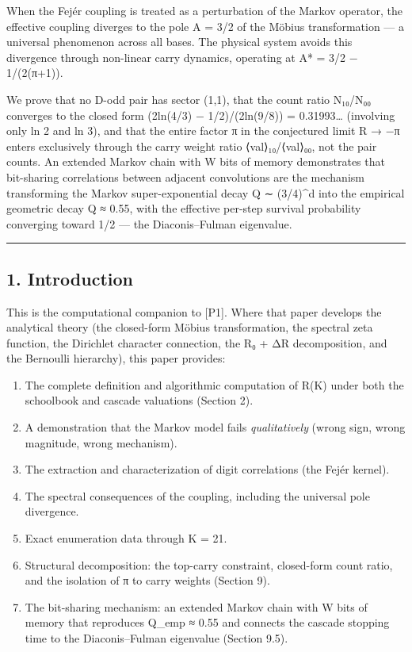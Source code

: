 \documentclass[
  11pt,
]{article}
\providecommand{\tightlist}{%
  \setlength{\itemsep}{0pt}\setlength{\parskip}{0pt}}
\begin{document}
When the Fejér coupling is treated as a perturbation of the Markov operator, the
effective coupling diverges to the pole A = 3/2 of the Möbius transformation ---
a universal phenomenon across all bases. The physical system avoids this
divergence through non-linear carry dynamics, operating at A* = 3/2 −
1/(2(π+1)).

We prove that no D-odd pair has sector (1,1), that the count ratio N₁₀/N₀₀
converges to the closed form (2ln(4/3) − 1/2)/(2ln(9/8)) = 0.31993\ldots{}
(involving only ln 2 and ln 3), and that the entire factor π in the conjectured
limit R → −π enters exclusively through the carry weight ratio ⟨val⟩₁₀/⟨val⟩₀₀,
not the pair counts. An extended Markov chain with W bits of memory demonstrates
that bit-sharing correlations between adjacent convolutions are the mechanism
transforming the Markov super-exponential decay Q ∼ (3/4)\^{}d into the
empirical geometric decay Q ≈ 0.55, with the effective per-step survival
probability converging toward 1/2 --- the Diaconis--Fulman eigenvalue.

\begin{center}\rule{0.5\linewidth}{0.5pt}\end{center}

\newpage

\subsection{1. Introduction}\label{introduction}

This is the computational companion to {[}P1{]}. Where that paper develops the
analytical theory (the closed-form Möbius transformation, the spectral zeta
function, the Dirichlet character connection, the R₀ + ΔR decomposition, and the
Bernoulli hierarchy), this paper provides:

\begin{enumerate}
\def\labelenumi{\arabic{enumi}.}
\tightlist
\item
  The complete definition and algorithmic computation of R(K) under both the
  schoolbook and cascade valuations (Section 2).
\item
  A demonstration that the Markov model fails \emph{qualitatively} (wrong sign,
  wrong magnitude, wrong mechanism).
\item
  The extraction and characterization of digit correlations (the Fejér kernel).
\item
  The spectral consequences of the coupling, including the universal pole
  divergence.
\item
  Exact enumeration data through K = 21.
\item
  Structural decomposition: the top-carry constraint, closed-form count ratio,
  and the isolation of π to carry weights (Section 9).
\item
  The bit-sharing mechanism: an extended Markov chain with W bits of memory that
  reproduces Q\_emp ≈ 0.55 and connects the cascade stopping time to the
  Diaconis--Fulman eigenvalue (Section 9.5).
\end{enumerate}
\end{document}
